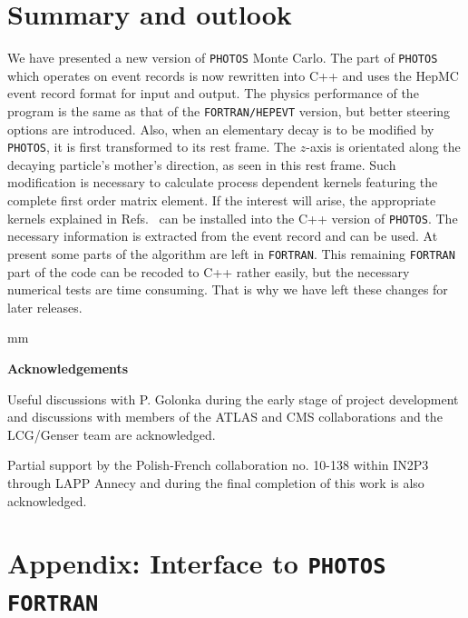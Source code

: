 \documentclass[]{Photos_interface_design}
\begin{document}
\section{Summary and outlook}
\label{sec:summary}
We have presented a new version  of {\tt PHOTOS} Monte Carlo. The part of 
{\tt PHOTOS} which operates on 
event records is now rewritten into C++ and uses the HepMC event record 
format for input and output. The physics performance of the program is the
same as that of the {\tt FORTRAN/HEPEVT} version, but better steering options are introduced. 
Also, when an elementary decay is to be modified by {\tt PHOTOS}, 
it is first transformed to its rest frame. The $z$-axis is orientated along the decaying particle's mother's direction, as seen in this rest  frame. Such modification is 
necessary to calculate process dependent kernels
featuring the complete first order matrix element. If the interest will arise,
the appropriate kernels explained in
Refs.~\cite{Golonka:2006tw,Nanava:2006vv,Nanava:2009vg} can be installed
into the C++ version of {\tt PHOTOS}. The necessary information is extracted
from the event record and can be used.
At present some parts of the algorithm are left in {\tt FORTRAN}.
 This remaining {\tt FORTRAN} part of the code 
can be recoded to C++ rather easily, but the necessary numerical tests 
are time consuming. That is why we have left these changes for later 
releases. 

\newpage
{} mm

\centerline{\large\bf Acknowledgements}


Useful discussions with P. Golonka during the early stage of project development and discussions 
with members of the ATLAS and CMS collaborations and the LCG/Genser team 
are acknowledged.


Partial support by the Polish-French collaboration
no. 10-138 within IN2P3 through LAPP Annecy and 
during the final completion of this work is
also acknowledged.



{}
% 






\newpage
\appendix

\section{Appendix: Interface to {\tt PHOTOS FORTRAN}}
\label{Interface to PHOTOS}
\end{document}
